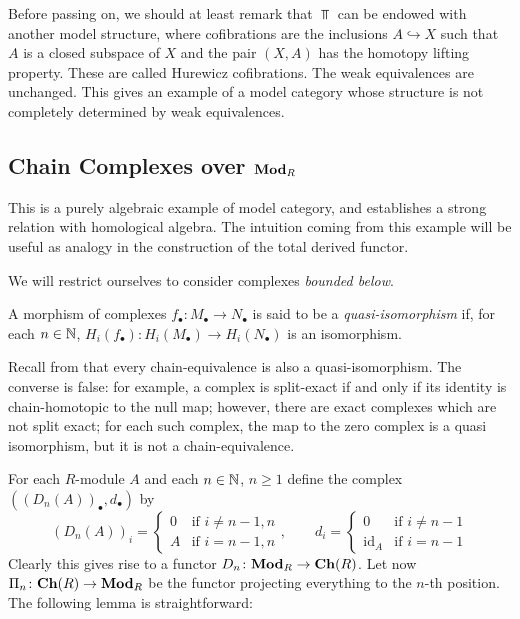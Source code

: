 Before passing on, we should at least remark that $\Top$ can be endowed with another model structure, where cofibrations are the inclusions $A \hookrightarrow X$ such that $A$ is a closed subspace of $X$ and the pair $(X,A)$ has the homotopy lifting property. These are called Hurewicz cofibrations. The weak equivalences are unchanged. This gives an example of a model category whose structure is not completely determined by weak equivalences.

\subsection{Chain Complexes over $\mathbf{Mod}_R$}

This is a purely algebraic example of model category, and establishes a strong relation with homological algebra. The intuition coming from this example will be useful as analogy in the construction of the total derived functor.

We will restrict ourselves to consider complexes \emph{bounded below}.

\begin{defin}
A morphism of complexes $f_\bullet \colon M_\bullet \to N_\bullet$ is said to be a \emph{quasi-isomorphism} if, for each $n \in \mathbb{N}$, $H_i(f_\bullet) \colon H_i(M_\bullet) \to H_i(N_\bullet)$ is an isomorphism.
\end{defin}

\begin{rmk}
Recall from \cite[Ch. I]{weibel} that every chain-equivalence is also a quasi-isomorphism. The converse is false: for example, a complex is split-exact if and only if its identity is chain-homotopic to the null map; however, there are exact complexes which are not split exact; for each such complex, the map to the zero complex is a quasi isomorphism, but it is not a chain-equivalence.
\end{rmk}

For each $R$-module $A$ and each $n \in \mathbb{N}$, $n \ge 1$ define the complex $((D_n(A))_\bullet,d_\bullet)$ by
\[
(D_n(A))_i = \begin{cases} 0 & \text{if } i \ne n - 1, n \\ A & \text{if } i = n-1,n \end{cases}, \qquad d_i = \begin{cases} 0 & \text{if } i \ne n-1 \\ \mathrm{id}_A & \text{if } i = n-1 \end{cases}
\]
Clearly this gives rise to a functor $D_n \colon \mathbf{Mod}_R \to \mathbf{Ch}(R)$. Let now $\Pi_n \colon \mathbf{Ch}(R) \to \mathbf{Mod}_R$ be the functor projecting everything to the $n$-th position. The following lemma is straightforward:

